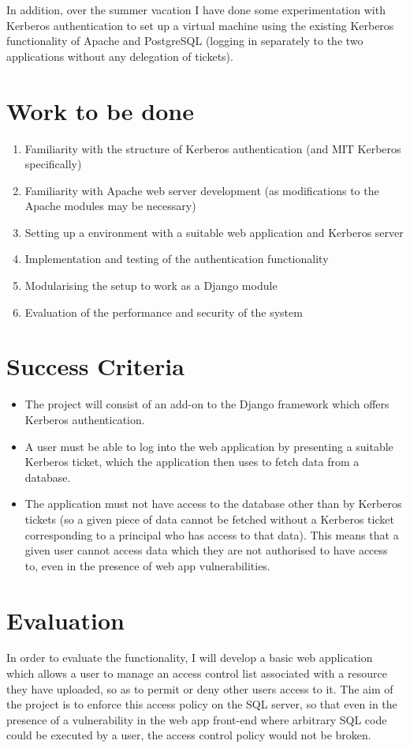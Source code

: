 \documentclass{article}
\begin{document}
In addition, over the summer vacation I have done some experimentation with Kerberos authentication to set up a virtual machine using the existing Kerberos functionality of Apache and PostgreSQL (logging in separately to the two applications without any delegation of tickets).

\section*{Work to be done}
\begin{enumerate}
\item Familiarity with the structure of Kerberos authentication (and MIT Kerberos specifically)
\item Familiarity with Apache web server development (as modifications to the Apache modules may be necessary)
\item Setting up a environment with a suitable web application and Kerberos server
\item Implementation and testing of the authentication functionality
\item Modularising the setup to work as a Django module
\item Evaluation of the performance and security of the system
\end{enumerate}

\section*{Success Criteria}
\begin{itemize}
\item The project will consist of an add-on to the Django framework which offers Kerberos authentication.
\item A user must be able to log into the web application by presenting a suitable Kerberos ticket, which the application then uses to fetch data from a database.
\item The application must not have access to the database other than by Kerberos tickets (so a given piece of data cannot be fetched without a Kerberos ticket corresponding to a principal who has access to that data). This means that a given user cannot access data which they are not authorised to have access to, even in the presence of web app vulnerabilities.
\end{itemize}

\section*{Evaluation}
In order to evaluate the functionality, I will develop a basic web application which allows a user to manage an access control list associated with a resource they have uploaded, so as to permit or deny other users access to it. The aim of the project is to enforce this access policy on the SQL server, so that even in the presence of a vulnerability in the web app front-end where arbitrary SQL code could be executed by a user, the access control policy would not be broken.
\end{document}
